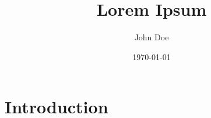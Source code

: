 \documentclass{article}
\title{Lorem Ipsum}
\author{John Doe}
\date{\today}
\begin{document}
\maketitle

\section{Introduction}

\lipsum[1]
\end{document}
